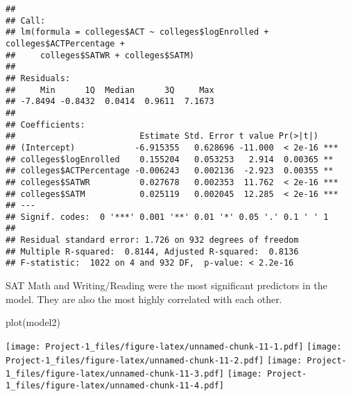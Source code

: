 \documentclass[
]{article}
\newenvironment{Shaded}{\begin{snugshade}}{\end{snugshade}}
\newcommand{\FunctionTok}[1]{\textcolor[rgb]{0.00,0.00,0.00}{#1}}
\newcommand{\NormalTok}[1]{#1}
\newcommand{\OtherTok}[1]{\textcolor[rgb]{0.56,0.35,0.01}{#1}}
\newcommand{\SpecialCharTok}[1]{\textcolor[rgb]{0.00,0.00,0.00}{#1}}
\begin{document}
\begin{Shaded}
\end{Shaded}

\begin{verbatim}
## 
## Call:
## lm(formula = colleges$ACT ~ colleges$logEnrolled + colleges$ACTPercentage + 
##     colleges$SATWR + colleges$SATM)
## 
## Residuals:
##     Min      1Q  Median      3Q     Max 
## -7.8494 -0.8432  0.0414  0.9611  7.1673 
## 
## Coefficients:
##                         Estimate Std. Error t value Pr(>|t|)    
## (Intercept)            -6.915355   0.628696 -11.000  < 2e-16 ***
## colleges$logEnrolled    0.155204   0.053253   2.914  0.00365 ** 
## colleges$ACTPercentage -0.006243   0.002136  -2.923  0.00355 ** 
## colleges$SATWR          0.027678   0.002353  11.762  < 2e-16 ***
## colleges$SATM           0.025119   0.002045  12.285  < 2e-16 ***
## ---
## Signif. codes:  0 '***' 0.001 '**' 0.01 '*' 0.05 '.' 0.1 ' ' 1
## 
## Residual standard error: 1.726 on 932 degrees of freedom
## Multiple R-squared:  0.8144, Adjusted R-squared:  0.8136 
## F-statistic:  1022 on 4 and 932 DF,  p-value: < 2.2e-16
\end{verbatim}

SAT Math and Writing/Reading were the most significant predictors in the
model. They are also the most highly correlated with each other.

\begin{Shaded}
\begin{Highlighting}[]
\FunctionTok{plot}\NormalTok{(model2)}
\end{Highlighting}
\end{Shaded}

\texttt{[image: Project-1\_files/figure-latex/unnamed-chunk-11-1.pdf]}
\texttt{[image: Project-1\_files/figure-latex/unnamed-chunk-11-2.pdf]}
\texttt{[image: Project-1\_files/figure-latex/unnamed-chunk-11-3.pdf]}
\texttt{[image: Project-1\_files/figure-latex/unnamed-chunk-11-4.pdf]}
\end{document}
